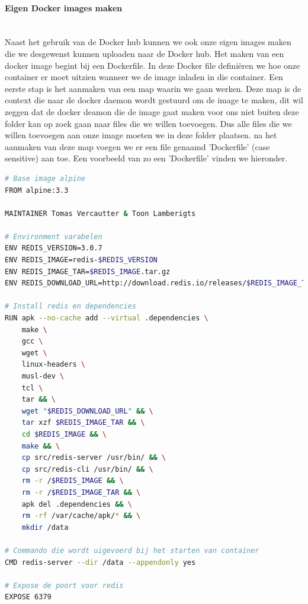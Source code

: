 \paragraph{Eigen Docker images maken}~\\

Naast het gebruik van de Docker hub kunnen we ook onze eigen images maken die we desgewenst kunnen uploaden naar de Docker hub. Het maken van een docker image begint bij een Dockerfile. In deze Docker file definiëren we hoe onze container er moet uitzien wanneer we de image inladen in die container. Een eerste stap is het aanmaken van een map waarin we gaan werken. Deze map is de context die naar de docker daemon wordt gestuurd om de image te maken, dit wil zeggen dat de docker deamon die de image gaat maken voor ons niet buiten deze folder kan op zoek gaan naar files die we willen toevoegen. Dus alle files die we willen toevoegen aan onze image moeten we in deze folder plaatsen. na het aanmaken van deze map voegen we er een file genaamd 'Dockerfile' (case sensitive) aan toe. Een voorbeeld van zo een 'Dockerfile' vinden we hieronder. 

\begin{lstlisting}[language=bash, style=configstyle]
# Base image alpine
FROM alpine:3.3

MAINTAINER Tomas Vercautter & Toon Lamberigts

# Environment varabelen
ENV REDIS_VERSION=3.0.7
ENV REDIS_IMAGE=redis-$REDIS_VERSION
ENV REDIS_IMAGE_TAR=$REDIS_IMAGE.tar.gz
ENV REDIS_DOWNLOAD_URL=http://download.redis.io/releases/$REDIS_IMAGE_TAR

# Install redis en dependencies
RUN apk --no-cache add --virtual .dependencies \
    make \
    gcc \
    wget \
    linux-headers \
    musl-dev \
    tcl \
    tar && \
    wget "$REDIS_DOWNLOAD_URL" && \
    tar xzf $REDIS_IMAGE_TAR && \
    cd $REDIS_IMAGE && \
    make && \
    cp src/redis-server /usr/bin/ && \
    cp src/redis-cli /usr/bin/ && \
    rm -r /$REDIS_IMAGE && \
    rm -r /$REDIS_IMAGE_TAR && \
    apk del .dependencies && \
    rm -rf /var/cache/apk/* && \
    mkdir /data

# Commando die wordt uigevoerd bij het starten van container
CMD redis-server --dir /data --appendonly yes

# Expose de poort voor redis
EXPOSE 6379
\end{lstlisting}

